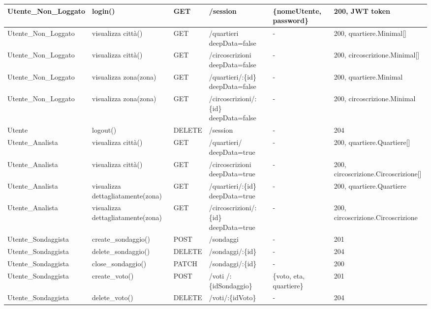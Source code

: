 {\begin{xltabular}{\textwidth}{|l|X|X|X|X|X|}
        \hline
        Utente\_Non\_Loggato & login() & GET & /session & \{nomeUtente, password\} & 200, JWT token  \\ \hline
         Utente\_Non\_Loggato & visualizza città() & GET & /quartieri deepData=false & - & 200, quartiere.Minimal[] \\ \hline
        Utente\_Non\_Loggato & visualizza città() & GET & /circoscrizioni deepData=false& - & 200, circoscrizione.Minimal[] \\ \hline
        Utente\_Non\_Loggato & visualizza zona(zona) & GET & /quartieri/:\{id\} deepData=false & - & 200, quartiere.Minimal  \\ \hline
        Utente\_Non\_Loggato & visualizza zona(zona) & GET & /circoscrizioni/:\{id\} deepData=false& - & 200, circoscrizione.Minimal \\ \hline
        Utente & logout() & DELETE & /session & - & 204  \\ \hline
        Utente\_Analista & visualizza città() & GET & /quartieri/ deepData=true & - & 200, quartiere.Quartiere[]  \\ \hline
        Utente\_Analista & visualizza città() & GET & /circoscrizioni deepData=true & - & 200, circoscrizione.Circoscrizione[] \\ \hline
        Utente\_Analista & visualizza dettagliatamente(zona) & GET & /quartieri/:\{id\} deepData=true & - & 200, quartiere.Quartiere  \\ \hline
        Utente\_Analista & visualizza dettagliatamente(zona) & GET & /circoscrizioni/:\{id\} deepData=true & - & 200, circoscrizione.Circoscrizione  \\ \hline
        Utente\_Sondaggista & create\_sondaggio() & POST & /sondaggi & - & 201  \\ \hline
        Utente\_Sondaggista & delete\_sondaggio() & DELETE & /sondaggi/:\{id\} & - & 204  \\ \hline
        Utente\_Sondaggista & close\_sondaggio() & PATCH & /sondaggi/:\{id\} & - & 200  \\ \hline
        Utente\_Sondaggista & create\_voto() & POST & /voti /:\{idSondaggio\} & \{voto, eta, quartiere\} & 201  \\ \hline
        Utente\_Sondaggista & delete\_voto() & DELETE & /voti/:\{idVoto\} & - & 204  \\ \hline
    \end{xltabular}
    }